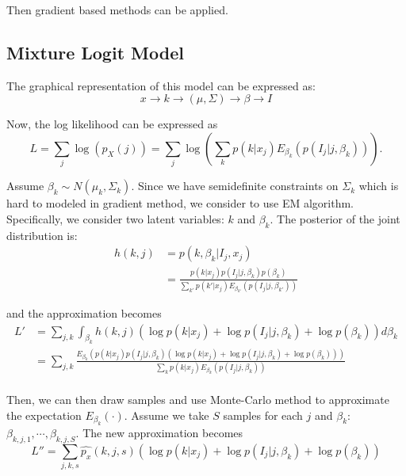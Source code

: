 \documentclass[english]{article}
\begin{document}
Then gradient based methods can be applied.

\subsection{Mixture Logit Model}

The graphical representation of this model can be expressed as:
\begin{equation}\nonumber
  x \to k \to (\mu,\Sigma) \to \beta \to I
\end{equation}

Now, the log likelihood can be expressed as
\begin{equation}\nonumber
  L = \sum_j\log(p_X(j)) = \sum_j\log(\sum_kp(k|x_j)E_{\beta_k}(p(I_j|j,\beta_k))).
\end{equation}

Assume $\beta_k\sim N(\mu_k,\Sigma_k)$. Since we have semidefinite constraints on $\Sigma_k$ which is hard to modeled in gradient method, we consider to use EM algorithm. Specifically, we consider two latent variables: $k$ and $\beta_k$. The posterior of the joint distribution is:
\begin{equation}\nonumber
  \begin{aligned}
    h(k,j) & = p(k,\beta_k|I_j,x_j)\\
    & = \frac{p(k|x_j)p(I_j|j,\beta_k)p(\beta_k)}{\sum_{k'}p(k'|x_j)E_{\beta_{k'}}(p(I_j|j,\beta_{k'}))}
  \end{aligned}
\end{equation}

\noindent and the approximation becomes
\begin{equation}
  \begin{aligned}
    L' & = \sum_{j,k}\int_{\beta_k} h(k,j)(\log p(k|x_j) + \log p(I_j|j,\beta_k)+\log p(\beta_k))d\beta_k \\
    & = \sum_{j,k}\frac{E_{\beta_k} (p(k|x_j)p(I_j|j,\beta_k)(\log p(k|x_j) + \log p(I_j|j,\beta_k)+\log p(\beta_k)))}{\sum_{k}p(k|x_j)E_{\beta_{k}}(p(I_j|j,\beta_{k}))}\\
  \end{aligned}
\end{equation}

Then, we can then draw samples and use Monte-Carlo method to approximate the expectation $E_{\beta_k}(\cdot)$. Assume we take $S$ samples for each $j$ and $\beta_k$: $\beta_{k,j,1},\cdots,\beta_{k,j,S}$. The new approximation becomes
\begin{equation}
  L'' = \sum_{j,k,s}\hat{p_x}(k,j,s)(\log p(k|x_j) + \log p(I_j|j,\beta_k)+\log p(\beta_k))
\end{equation}
\end{document}

